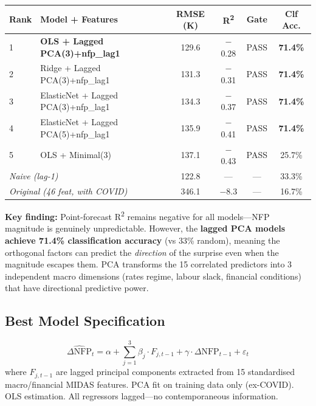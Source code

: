 \documentclass[11pt,a4paper]{article}
\begin{document}
\begin{table}[H]
\centering\small
\begin{tabular}{llcccc}
\toprule
\textbf{Rank} & \textbf{Model + Features} & \textbf{RMSE (K)} & \textbf{R\textsuperscript{2}} & \textbf{Gate} & \textbf{Clf Acc.} \\
\midrule
1 & \textbf{OLS + Lagged PCA(3)+nfp\_lag1} & 129.6 & $-$0.28 & PASS & \textbf{71.4\%} \\
2 & Ridge + Lagged PCA(3)+nfp\_lag1 & 131.3 & $-$0.31 & PASS & \textbf{71.4\%} \\
3 & ElasticNet + Lagged PCA(3)+nfp\_lag1 & 134.3 & $-$0.37 & PASS & \textbf{71.4\%} \\
4 & ElasticNet + Lagged PCA(5)+nfp\_lag1 & 135.9 & $-$0.41 & PASS & \textbf{71.4\%} \\
5 & OLS + Minimal(3) & 137.1 & $-$0.43 & PASS & 25.7\% \\
\midrule
\multicolumn{2}{l}{\textit{Naive (lag-1)}} & 122.8 & --- & --- & 33.3\% \\
\multicolumn{2}{l}{\textit{Original (46 feat, with COVID)}} & 346.1 & $-$8.3 & --- & 16.7\% \\
\bottomrule
\end{tabular}
\end{table}

\noindent\textbf{Key finding:} Point-forecast R\textsuperscript{2} remains negative for all models---NFP magnitude is genuinely unpredictable. However, the \textbf{lagged PCA models achieve 71.4\% classification accuracy} (vs 33\% random), meaning the orthogonal factors can predict the \textit{direction} of the surprise even when the magnitude escapes them. PCA transforms the 15 correlated predictors into 3 independent macro dimensions (rates regime, labour slack, financial conditions) that have directional predictive power.

\subsection*{Best Model Specification}
\vspace{-0.2cm}
\begin{equation*}
\widehat{\Delta\text{NFP}}_t = \alpha + \sum_{j=1}^{3} \beta_j \cdot F_{j,t-1} + \gamma \cdot \Delta\text{NFP}_{t-1} + \varepsilon_t
\end{equation*}
\noindent where $F_{j,t-1}$ are lagged principal components extracted from 15 standardised macro/financial MIDAS features. PCA fit on training data only (ex-COVID). OLS estimation. All regressors lagged---no contemporaneous information.
\end{document}

